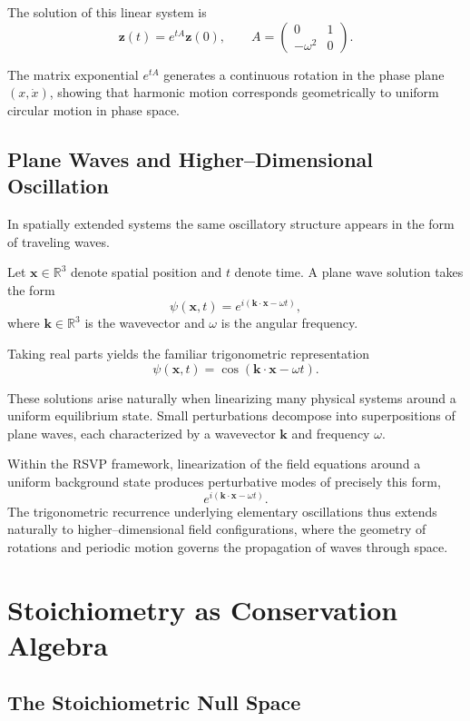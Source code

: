 \documentclass[11pt, openany]{book}
\theoremstyle{plain}
\theoremstyle{definition}
\theoremstyle{remark}
\begin{document}
The solution of this linear system is
\[
\mathbf{z}(t)=e^{tA}\mathbf{z}(0),
\qquad
A=
\begin{pmatrix}
0 & 1 \\
-\omega^2 & 0
\end{pmatrix}.
\]

The matrix exponential $e^{tA}$ generates a continuous rotation in the
phase plane $(x,\dot{x})$, showing that harmonic motion corresponds
geometrically to uniform circular motion in phase space.

\section{Plane Waves and Higher–Dimensional Oscillation}

In spatially extended systems the same oscillatory structure appears in
the form of traveling waves.

Let $\mathbf{x}\in\mathbb{R}^3$ denote spatial position and $t$ denote
time.  A plane wave solution takes the form
\[
\psi(\mathbf{x},t)
=
e^{i(\mathbf{k}\cdot\mathbf{x}-\omega t)},
\]
where $\mathbf{k}\in\mathbb{R}^3$ is the wavevector and $\omega$ is the
angular frequency.

Taking real parts yields the familiar trigonometric representation
\[
\psi(\mathbf{x},t)
=
\cos(\mathbf{k}\cdot\mathbf{x}-\omega t).
\]

These solutions arise naturally when linearizing many physical systems
around a uniform equilibrium state.  Small perturbations decompose into
superpositions of plane waves, each characterized by a wavevector
$\mathbf{k}$ and frequency $\omega$.

Within the RSVP framework, linearization of the field equations around a
uniform background state produces perturbative modes of precisely this
form,
\[
e^{i(\mathbf{k}\cdot\mathbf{x}-\omega t)}.
\]
The trigonometric recurrence underlying elementary oscillations thus
extends naturally to higher–dimensional field configurations, where the
geometry of rotations and periodic motion governs the propagation of
waves through space.

\chapter{Stoichiometry as Conservation Algebra}

\section{The Stoichiometric Null Space}
\end{document}
